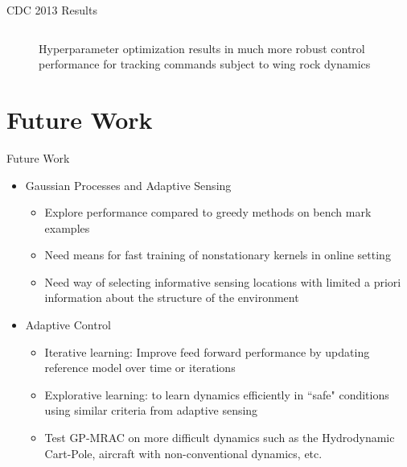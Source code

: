 \documentclass[11pt,mathserif]{beamer}
\begin{document}
\begin{frame}[t]{CDC 2013 Results}
\begin{figure}
\begin{columns}[T]
\begin{column}{.45\textwidth}
\begin{figure}
\end{figure}
\end{column}
\end{columns}
\caption{Hyperparameter optimization results in much more robust
  control performance for tracking commands subject to wing rock dynamics}
\end{figure}


\end{frame}


\section[Future Work]{Future Work}
\begin{frame}[t]{Future Work}
\begin{itemize}
\item Gaussian Processes and Adaptive Sensing
  \begin{itemize}
\item Explore performance compared to greedy methods on bench mark examples
    \item Need means for fast training of nonstationary kernels in
      online setting
      \item Need way of selecting informative sensing locations with
        limited a priori information about the structure of the environment
  \end{itemize}
\item Adaptive Control
  \begin{itemize}
  \item Iterative learning: Improve feed forward performance by updating
    reference model over time or iterations
\item Explorative learning: to learn dynamics efficiently in ``safe" conditions using similar criteria from adaptive sensing
    \item Test GP-MRAC on more difficult dynamics such as the
      Hydrodynamic Cart-Pole, aircraft with non-conventional dynamics, etc.
  \end{itemize}
\end{itemize}


\end{frame}







\setcounter{finalframe}{\value{framenumber}}
\end{document}
